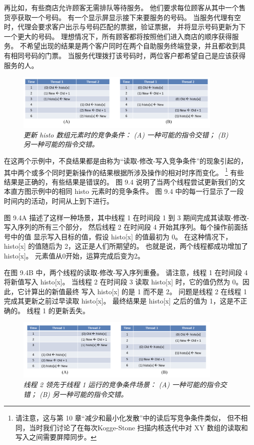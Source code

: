 再比如，有些商店允许顾客无需排队等待服务。 他们要求每位顾客从其中一个售货亭获取一个号码。 
有一个显示屏显示接下来要服务的号码。 当服务代理有空时，代理会要求客户出示与号码匹配的票据，验证票据，
并将显示号码更新为下一个更大的号码。 理想情况下，所有顾客都将按照他们进入商店的顺序获得服务。 
不希望出现的结果是两个客户同时在两个自助服务终端登录，并且都收到具有相同号码的门票。 
当服务代理拨打该号码时，两位客户都希望自己是应该获得服务的人。

\begin{figure}[H]
	\centering
	\includegraphics[width=0.9\textwidth]{figs/F9.4.png}
	\caption{\textit{更新 histo 数组元素时的竞争条件： (A) 一种可能的指令交错； (B) 另一种可能的指令交错。}}
\end{figure}

在这两个示例中，不良结果都是由称为“读取-修改-写入竞争条件”的现象引起的，
其中两个或多个同时更新操作的结果根据所涉及操作的相对时序而变化。 
\footnote{请注意，这与第 10 章“减少和最小化发散”中的读后写竞争条件类似，
但不相同，当时我们讨论了在每次Kogge-Stone 扫描内核迭代中对 XY 数组的读取和写入之间需要屏障同步。}
有些结果是正确的，有些结果是错误的。
图 9.4 说明了当两个线程尝试更新我们的文本直方图示例中的相同 histo 元素时的竞争条件。 
图 9.4 中的每一行显示了一段时间内的活动，时间从上到下进行。

图 9.4A 描述了这样一种场景，其中线程 1 在时间段 1 到 3 期间完成其读取-修改-写入序列的所有三个部分，
然后线程 2 在时间段 4 开始其序列。每个操作前面括号中的值 显示写入目标的值，假设 histo[x] 的值最初为 0。
在这种情况下，histo[x] 的值随后为 2，这正是人们所期望的。 也就是说，两个线程都成功增加了 histo[x]。 
元素值从0开始，运算完成后变为2。

在图 9.4B 中，两个线程的读取-修改-写入序列重叠。 请注意，线程 1 在时间段 4 将新值写入 histo[x]。
当线程 2 在时间段 3 读取 histo[x] 时，它的值仍然为 0。因此，它计算出的新值最终 写入 histo[x] 的是 1 而不是 2。
问题是线程 2 在线程 1 完成其更新之前过早读取 histo[x]。 最终结果是 histo[x] 之后的值为 1，这是不正确的。 
线程 1 的更新丢失。

\begin{figure}[H]
	\centering
	\includegraphics[width=0.9\textwidth]{figs/F9.5.png}
	\caption{\textit{线程 2 领先于线程 1 运行的竞争条件场景： (A) 一种可能的指令交错； (B) 另一种可能的指令交错。}}
\end{figure}

